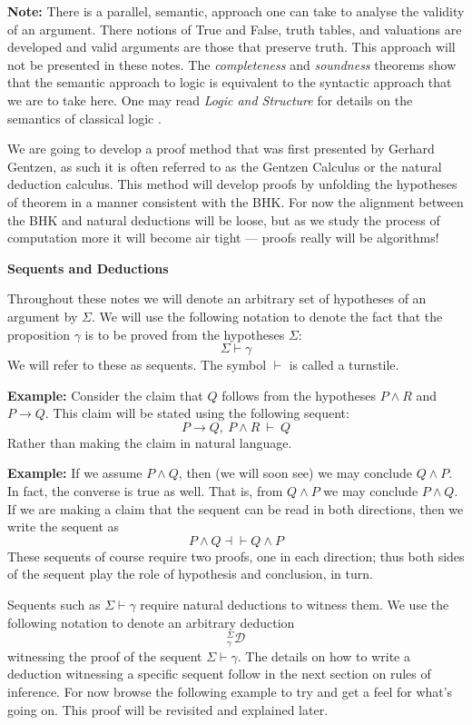 \documentclass{book}
\begin{document}
    {\bf Note:} There is a parallel, semantic, approach one can take to analyse the validity of an argument. There notions of True and False, truth tables, and valuations are developed and valid arguments are those that preserve truth. This approach will not be presented in these notes. The \emph{completeness} and \emph{soundness} theorems show that the semantic approach to logic is equivalent to the syntactic approach that we are to take here. One may read \emph{Logic and Structure} for details on the semantics of classical logic \cite{vDalen}.

    We are going to develop a proof method that was first presented by Gerhard Gentzen, as such it is often referred to as the Gentzen Calculus or the natural deduction calculus. This method will develop proofs by unfolding the hypotheses of theorem in a manner consistent with the BHK. For now the alignment between the BHK and natural deductions will be loose, but as we study the process of computation more it will become air tight --- proofs really will be algorithms! 

    \begin{center}
        {\bf Sequents and Deductions}
    \end{center}

    Throughout these notes we will denote an arbitrary set of hypotheses of an argument by $\Sigma$. We will use the following notation to denote the fact that the proposition $\gamma$ is to be proved from the hypotheses $\Sigma$: $$\Sigma \vdash \gamma$$ We will refer to these as sequents. The symbol $\vdash$ is called a turnstile. 

    {\bf Example:} Consider the claim that $Q$ follows from the hypotheses $P\land R$ and $P\to Q$. This claim will be stated using the following sequent: $$P \to Q, \ P \land R \ \vdash \ Q$$ Rather than making the claim in natural language. 

    {\bf Example:} If we assume $P \land Q$, then (we will soon see) we may conclude $Q \land P$. In fact, the converse is true as well. That is, from $Q \land P$ we may conclude $P \land Q$. If we are making a claim that the sequent can be read in both directions, then we write the sequent as $$P \land Q \dashv \vdash Q \land P $$ These sequents of course require two proofs, one in each direction; thus both sides of the sequent play the role of hypothesis and conclusion, in turn.

    Sequents such as $\Sigma \vdash \gamma$ require natural deductions to witness them. We use the following notation to denote an arbitrary deduction $$^{\Sigma}_{\gamma}\mathcal{D}$$ witnessing the proof of the sequent $\Sigma \vdash \gamma$. The details on how to write a deduction witnessing a specific sequent follow in the next section on rules of inference. For now browse the following example to try and get a feel for what's going on. This proof will be revisited and explained later. 
\end{document}
